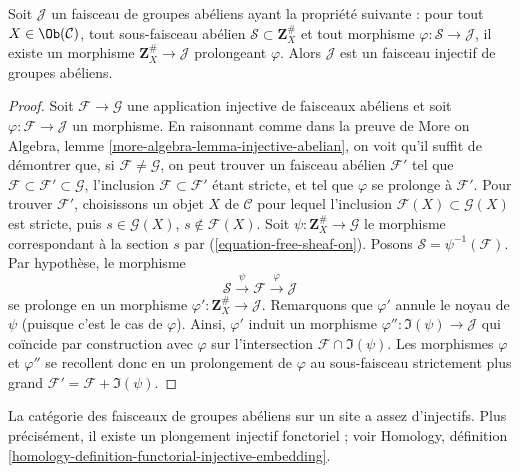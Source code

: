 \begin{lemma}
\label{lemma-characterize-injectives}
Soit $\mathcal{J}$ un faisceau de groupes abéliens ayant la propriété
suivante : pour tout $X\in \Ob(\mathcal{C})$, tout sous-faisceau abélien
$\mathcal{S} \subset \mathbf{Z}_X^\#$ et tout morphisme
$\varphi : \mathcal{S} \to \mathcal{J}$, il existe un morphisme
$\mathbf{Z}_X^\# \to \mathcal{J}$ prolongeant $\varphi$. Alors $\mathcal{J}$
est un faisceau injectif de groupes abéliens.
\end{lemma}

\begin{proof}
Soit $\mathcal{F} \to \mathcal{G}$ une application injective de faisceaux
abéliens et soit $\varphi : \mathcal{F} \to \mathcal{J}$ un morphisme.
En raisonnant comme dans la preuve de
More on Algebra, lemme \ref{more-algebra-lemma-injective-abelian}, on voit qu'il
suffit de démontrer que, si $\mathcal{F} \not = \mathcal{G}$, on peut trouver
un faisceau abélien $\mathcal{F}'$ tel que
$\mathcal{F} \subset \mathcal{F}' \subset \mathcal{G}$, l'inclusion
$\mathcal{F} \subset \mathcal{F}'$ étant stricte, et tel que $\varphi$ se
prolonge à $\mathcal{F}'$. Pour trouver $\mathcal{F}'$, choisissons un objet
$X$ de $\mathcal{C}$ pour lequel l'inclusion
$\mathcal{F}(X) \subset \mathcal{G}(X)$ est stricte, puis
$s \in \mathcal{G}(X)$, $s \not \in \mathcal{F}(X)$. Soit
$\psi : \mathbf{Z}_X^\# \to \mathcal{G}$ le morphisme correspondant à la
section $s$ par (\ref{equation-free-sheaf-on}). Posons
$\mathcal{S} = \psi^{-1}(\mathcal{F})$. Par hypothèse, le morphisme
$$
\mathcal{S} \xrightarrow{\psi} \mathcal{F} \xrightarrow{\varphi} \mathcal{J}
$$
se prolonge en un morphisme $\varphi' : \mathbf{Z}_X^\# \to \mathcal{J}$.
Remarquons que $\varphi'$ annule le noyau de $\psi$ (puisque c'est le cas de
$\varphi$). Ainsi, $\varphi'$ induit un morphisme
$\varphi'' : \Im(\psi) \to \mathcal{J}$ qui coïncide par construction avec
$\varphi$ sur l'intersection $\mathcal{F} \cap \Im(\psi)$. Les morphismes
$\varphi$ et $\varphi''$ se recollent donc en un prolongement de $\varphi$ au
sous-faisceau strictement plus grand
$\mathcal{F}' = \mathcal{F} + \Im(\psi)$.
\end{proof}

\begin{theorem}
\label{theorem-sheaves-injectives}
La catégorie des faisceaux de groupes abéliens sur un site a assez
d'injectifs. Plus précisément, il existe un plongement injectif fonctoriel ;
voir Homology, définition
\ref{homology-definition-functorial-injective-embedding}.
\end{theorem}

